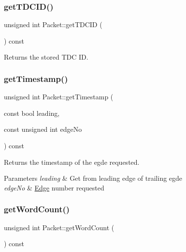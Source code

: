 \subsubsection{\texorpdfstring{get\+T\+D\+C\+I\+D()}{getTDCID()}}
{\footnotesize\ttfamily unsigned int Packet\+::get\+T\+D\+C\+ID (\begin{DoxyParamCaption}{ }\end{DoxyParamCaption}) const\hspace{0.3cm}{\ttfamily [inline]}}



Returns the stored T\+DC ID. 

\mbox{\label{class_packet_a7a15b0965a125dd8441297007581c637}} 
\subsubsection{\texorpdfstring{get\+Timestamp()}{getTimestamp()}}
{\footnotesize\ttfamily unsigned int Packet\+::get\+Timestamp (\begin{DoxyParamCaption}\item[{const bool}]{leading,  }\item[{const unsigned int}]{edge\+No }\end{DoxyParamCaption}) const}



Returns the timestamp of the egde requested. 


\begin{DoxyParams}{Parameters}
{\em leading} & Get from leading edge of trailing egde \\
\hline
{\em edge\+No} & \hyperlink{class_edge}{Edge} number requested \\
\hline
\end{DoxyParams}
\mbox{\label{class_packet_aaa356da77eccb505207544c8034c1356}} 
\subsubsection{\texorpdfstring{get\+Word\+Count()}{getWordCount()}}
{\footnotesize\ttfamily unsigned int Packet\+::get\+Word\+Count (\begin{DoxyParamCaption}{ }\end{DoxyParamCaption}) const\hspace{0.3cm}{\ttfamily [inline]}}



